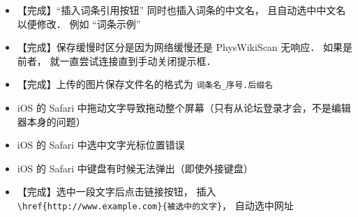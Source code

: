 \begin{itemize}
\item 【完成】“插入词条引用按钮” 同时也插入词条的中文名， 且自动选中中文名以便修改． 例如 “词条示例”

\item 【完成】保存缓慢时区分是因为网络缓慢还是 PhysWikiScan 无响应． 如果是前者， 就一直尝试连接直到手动关闭提示框．

\item 【完成】上传的图片保存文件名的格式为 \verb|词条名_序号.后缀名|

\item iOS 的 Safari 中拖动文字导致拖动整个屏幕（只有从论坛登录才会，不是编辑器本身的问题）

\item iOS 的 Safari 中选中文字光标位置错误

\item iOS 的 Safari 中键盘有时候无法弹出（即使外接键盘）

\item 【完成】选中一段文字后点击链接按钮， 插入 \lstinline|\href{http://www.example.com}{被选中的文字}|， 自动选中网址
\end{itemize}

